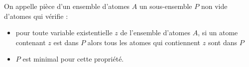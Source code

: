 

\begin{definition}\label{def:piece_atomes}
    On appelle pièce d’un ensemble d'atomes $A$ un sous-ensemble $P$ non vide d’atomes qui vérifie : 
    \begin{itemize}
        \item pour toute variable existentielle $z$ de l'ensemble d'atomes $A$, si un atome contenant $z$ est dans $P$ alors tous les atomes qui contiennent $z$ sont dans $P$ 
        \item $P$ est minimal pour cette propriété.
    \end{itemize}
\end{definition}






